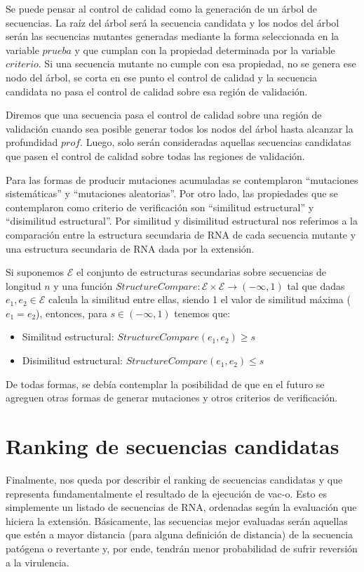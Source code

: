 Se puede pensar al control de calidad como la generaci\'on de un \'arbol de
secuencias. La ra\'iz del \'arbol ser\'a la secuencia candidata y los nodos del
\'arbol ser\'an las secuencias mutantes generadas mediante la forma seleccionada
en la variable $prueba$ y que cumplan con la propiedad determinada por la
variable $criterio$. Si una secuencia mutante no cumple con esa propiedad, no se
genera ese nodo del \'arbol, se corta en ese punto el control de calidad y la
secuencia candidata no pasa el control de calidad sobre esa regi\'on de
validaci\'on.

Diremos que una secuencia pasa el control de calidad sobre una regi\'on de
validaci\'on cuando sea posible generar todos los nodos del \'arbol hasta
alcanzar la profundidad $prof$. Luego, solo ser\'an consideradas aquellas
secuencias candidatas que pasen el control de calidad sobre todas las regiones
de validaci\'on.

Para las formas de producir mutaciones acumuladas se contemplaron ``mutaciones
sistem\'aticas'' y ``mutaciones aleatorias''. Por otro lado, las propiedades
que se contemplaron como criterio de verificaci\'on son ``similitud
estructural'' y ``disimilitud estructural''. Por similitud y disimilitud
estructural nos referimos a la comparaci\'on entre la estructura secundaria de
\ac{RNA} de cada secuencia mutante y una estructura secundaria de \ac{RNA} dada
por la extensi\'on. 

Si suponemos $\mathcal{E}$ el conjunto de estructuras secundarias sobre
secuencias de longitud $n$ y una funci\'on $StructureCompare : \mathcal{E}
\times \mathcal{E} \rightarrow (-\infty, 1)$ tal que dadas $e_{1},e_{2} \in
\mathcal{E}$ calcula la similitud entre ellas, siendo 1 el valor de similitud
m\'axima ($e_{1} = e_{2}$), entonces, para $s \in (-\infty, 1)$ tenemos que:
\begin{itemize}
 \item Similitud estructural: $StructureCompare(e_{1}, e_{2}) \ge s$
 \item Disimilitud estructural: $StructureCompare(e_{1}, e_{2}) \le s$
\end{itemize}

De todas formas, se deb\'ia contemplar la posibilidad de que en el
futuro se agreguen otras formas de generar mutaciones y otros criterios de
verificaci\'on.

\section{Ranking de secuencias candidatas}

Finalmente, nos queda por describir el ranking de secuencias candidatas y que
representa fundamentalmente el resultado de la ejecuci\'on de \ac{vac-o}. Esto
es simplemente un listado de secuencias de \ac{RNA}, ordenadas seg\'un la
evaluaci\'on que hiciera la extensi\'on. B\'asicamente, las secuencias mejor
evaluadas ser\'an aquellas que est\'en a mayor distancia (para alguna
definici\'on de distancia) de la secuencia pat\'ogena o revertante y, por ende,
tendr\'an menor probabilidad de sufrir reversi\'on a la virulencia.